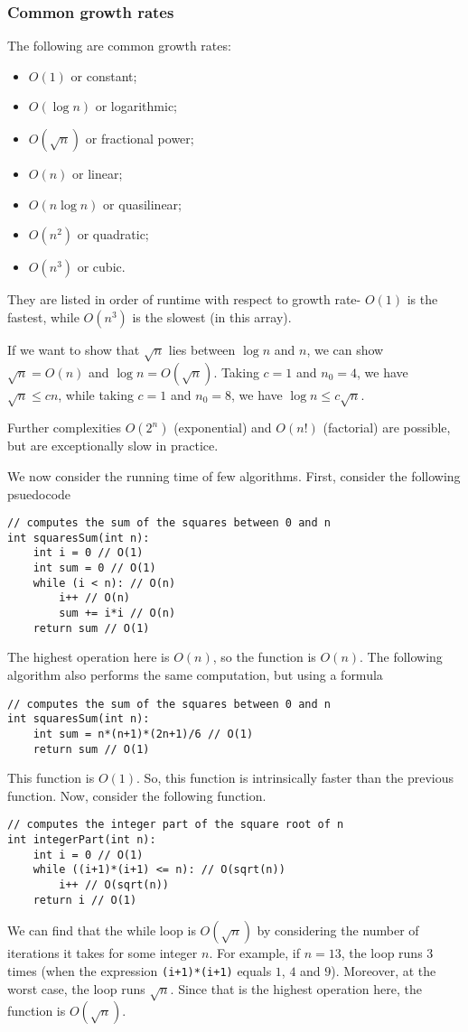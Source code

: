 \documentclass[a4paper, openany]{memoir}
\begin{document}
\subsubsection{Common growth rates}
The following are common growth rates:
\begin{itemize}
    \item $O(1)$ or constant;
    \item $O(\log n)$ or logarithmic;
    \item $O(\sqrt{n})$ or fractional power;
    \item $O(n)$ or linear;
    \item $O(n \log n)$ or quasilinear;
    \item $O(n^2)$ or quadratic;
    \item $O(n^3)$ or cubic.
\end{itemize}
They are listed in order of runtime with respect to growth rate- $O(1)$ is the fastest, while $O(n^3)$ is the slowest (in this array). 

\noindent If we want to show that $\sqrt{n}$ lies between $\log n$ and $n$, we can show $\sqrt{n} = O(n)$ and $\log n = O(\sqrt{n})$. Taking $c = 1$ and $n_0 = 4$, we have $\sqrt{n} \leq cn$, while taking $c = 1$ and $n_0 = 8$, we have $\log n \leq c \sqrt{n}$.

\noindent Further complexities $O(2^n)$ (exponential) and $O(n!)$ (factorial) are possible, but are exceptionally slow in practice.

\noindent We now consider the running time of few algorithms. First, consider the following psuedocode
\begin{lstlisting}[language=pseudocode]
// computes the sum of the squares between 0 and n
int squaresSum(int n):
    int i = 0 // O(1)
    int sum = 0 // O(1)
    while (i < n): // O(n)
        i++ // O(n)
        sum += i*i // O(n)
    return sum // O(1)
\end{lstlisting}
The highest operation here is $O(n)$, so the function is $O(n)$. The following algorithm also performs the same computation, but using a formula
\begin{lstlisting}[language=pseudocode]
// computes the sum of the squares between 0 and n
int squaresSum(int n):
    int sum = n*(n+1)*(2n+1)/6 // O(1)
    return sum // O(1)
\end{lstlisting}
This function is $O(1)$. So, this function is intrinsically faster than the previous function.
\noindent Now, consider the following function.
\begin{lstlisting}[language=pseudocode]
// computes the integer part of the square root of n
int integerPart(int n):
    int i = 0 // O(1)
    while ((i+1)*(i+1) <= n): // O(sqrt(n))
        i++ // O(sqrt(n))
    return i // O(1)
\end{lstlisting}
We can find that the while loop is $O(\sqrt{n})$ by considering the number of iterations it takes for some integer $n$. For example, if $n = 13$, the loop runs 3 times (when the expression \texttt{(i+1)*(i+1)} equals $1$, $4$ and $9$). Moreover, at the worst case, the loop runs $\sqrt{n}$. Since that is the highest operation here, the function is $O(\sqrt{n})$.
\end{document}
